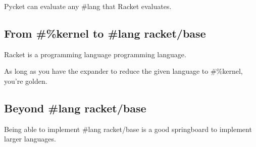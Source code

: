 		\begin{mainpoint}
			Pycket can evaluate any \#lang that Racket evaluates.
		\end{mainpoint}

		\subsection{From \#\%kernel to \#lang racket/base}
			\begin{mainpoint}
				Racket is a programming language programming language.

				As long as you have the expander to reduce the given language to \#\%kernel, you're golden.
			\end{mainpoint}

		\subsection{Beyond \#lang racket/base}
			\begin{mainpoint}
				Being able to implement \#lang racket/base is a good springboard to implement larger languages.
			\end{mainpoint}
